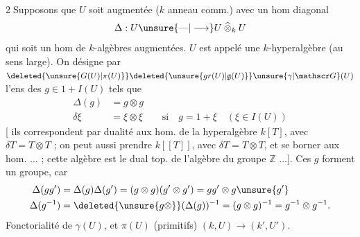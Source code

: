 \textcircled{2}\quad Supposons que $U$ soit  
augmentée ($k$ anneau comm.) avec un
hom diagonal
\[
\Delta:U\unsure{\text{—}|\longrightarrow} U\mathbin{\widehat\otimes}_k U
\]
qui soit un hom de $k$-algèbres augmentées.
$U$ est appelé une $k$-hyperalgèbre  (au sens
large). On désigne par $\deleted{\unsure{G(U)|\pi(U)}}\deleted{\unsure{gr(U)|\mathfrak g(U)}}\unsure{\gamma|\mathscr G}(U)$ l'ens
des $g\in 1+I(U)$  tels que
\[
\begin{aligned}
\Delta(g)&=g\otimes g\\
\delta\xi&=\xi\otimes\xi\qquad\text{si}\quad g=1+\xi\quad(\xi\in I(U))
\end{aligned}
\]
[ ils correspondent par dualité aux
hom. de la hyperalgèbre 
$k[T]$, avec $\delta T=T\otimes T$ ; on peut aussi
prendre $k[[T]]$, avec $\delta T=T\otimes T$, et
se borner aux hom.  $\ldots$ \unsure{]|\}} ;
cette algèbre est le dual top. de
l'algèbre du groupe $\mathbb Z$ $\ldots$].
 Ces $g$ forment un groupe, car
\[
\begin{aligned}
\Delta(gg')&=\Delta(g)\Delta(g')=(g\otimes g)(g'\otimes g')=gg'\otimes g\unsure{g'}\\
\Delta(g^{-1})&=\deleted{\unsure{g\otimes}}(\Delta(g))^{-1}=(g\otimes g)^{-1}=g^{-1}\otimes g^{-1}.
\end{aligned}
\]
Fonctorialité de $\gamma(U)$, et $\pi(U)$ (primitifs)
  $(k,U)\longrightarrow(k',U')$.

